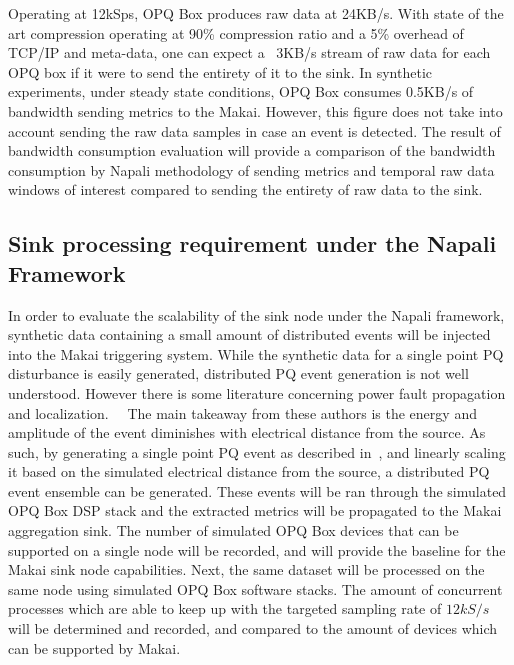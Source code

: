 Operating at 12kSps, OPQ Box produces raw data at 24KB/s.
With state of the art compression operating at 90\% compression ratio and a 5\% overhead of TCP/IP and meta-data, one can expect a ~3KB/s stream of raw data for each OPQ box if it were to send the entirety of it to the sink.
In synthetic experiments, under steady state conditions, OPQ Box consumes 0.5KB/s of bandwidth sending metrics to the Makai.
However, this figure does not take into account sending the raw data samples in case an event is detected.
The result of bandwidth consumption evaluation will provide a comparison of the bandwidth consumption by Napali methodology of sending metrics and temporal raw data windows of interest compared to sending the entirety of raw data to the sink.

\subsection{Sink processing requirement under the Napali Framework} \label{iexp:sec:scale}
In order to evaluate the scalability of the sink node under the Napali framework, synthetic data containing a small amount of distributed events will be injected into the Makai triggering system.
While the synthetic data for a single point PQ disturbance is easily generated, distributed PQ event generation is not well understood.
However there is some literature concerning power fault propagation and localization.~\cite{parsons1998direction}~\cite{polajvzer2017evaluation} The main takeaway from these authors is the energy and amplitude of the event diminishes with electrical distance from the source.
As such, by generating a single point PQ event as described in~\cite{kumar2015power}\cite{tan2013simulation}, and linearly scaling it based on the simulated electrical distance from the source, a distributed PQ event ensemble can be generated.
These events will be ran through the simulated OPQ Box DSP stack and the extracted metrics will be propagated to the Makai aggregation sink.
The number of simulated OPQ Box devices that can be supported on a single node will be recorded, and will provide the baseline for the Makai sink node capabilities.
Next, the same dataset will be processed on the same node using simulated OPQ Box software stacks.
The amount of concurrent processes which are able to keep up with the targeted sampling rate of $12kS/s$ will be determined and recorded, and compared to the amount of devices which can be supported by Makai.

